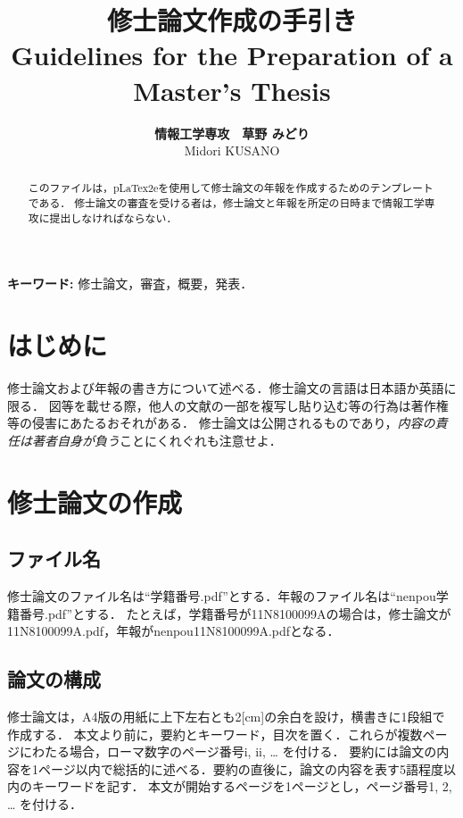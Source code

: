 \documentclass[10pt,a4paper,notitlepage,oneside,twocolumn]{abst_jsarticle}
\title{
{\bf 修士論文作成の手引き}\\
{\sf Guidelines for the Preparation of a Master's Thesis}\\
}
\author{
{\large {\bf 情報工学専攻　草野 みどり}}\\
{\large {\sf Midori KUSANO}}
}
\date{}
\begin{document}
\maketitle
\thispagestyle{firstpage}

\begin{abstract}
このファイルは，pLaTex2eを使用して修士論文の年報を作成するためのテンプレートである．
修士論文の審査を受ける者は，修士論文と年報を所定の日時まで情報工学専攻に提出しなければならない．
\end{abstract}


\vspace{1zw} \noindent
{\bf キーワード:} 
修士論文，審査，概要，発表．


\section{はじめに} \label{sec:section1}

修士論文および年報の書き方について述べる．修士論文の言語は日本語か英語に限る．
図等を載せる際，他人の文献の一部を複写し貼り込む等の行為は著作権等の侵害にあたるおそれがある．
修士論文は公開されるものであり，{\em 内容の責任は著者自身が負う}ことにくれぐれも注意せよ．


\section{修士論文の作成} \label{sec:section2}

\subsection{ファイル名} \label{subsec:section2}

修士論文のファイル名は“学籍番号.pdf”とする．年報のファイル名は“nenpou学籍番号.pdf”とする．
たとえば，学籍番号が11N8100099Aの場合は，修士論文が11N8100099A.pdf，年報がnenpou11N8100099A.pdfとなる．


\subsection{論文の構成} \label{subsec:section21}

修士論文は，A4版の用紙に上下左右とも2[cm]の余白を設け，横書きに1段組で作成する．
本文より前に，要約とキーワード，目次を置く．これらが複数ページにわたる場合，ローマ数字のページ番号i, ii, … を付ける．
要約には論文の内容を1ページ以内で総括的に述べる．要約の直後に，論文の内容を表す5語程度以内のキーワードを記す．
本文が開始するページを1ページとし，ページ番号1, 2, … を付ける．
\end{document}
